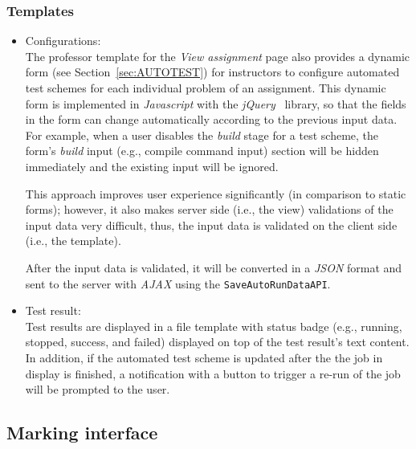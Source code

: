 \subsubsection{Templates}
\begin{itemize}
    \item Configurations: \\
    The professor template for the \emph{View assignment} page also provides
    a dynamic form (see Section~\ref{sec:AUTOTEST}) for instructors to
    configure automated test schemes for
    each individual problem of an assignment. 
    This dynamic form is implemented in \emph{Javascript} with the
    \emph{jQuery}~\cite{jQuery} library, so that the fields in the form can
    change automatically according to the previous input data.
    For example, when a user disables the \emph{build} stage for a test scheme,
    the form's \emph{build} input (e.g., compile command input) section will
    be hidden immediately and the existing input will be ignored.

    This approach improves user experience significantly (in comparison to
    static forms); however, it also makes server side (i.e., the view)
    validations of the
    input data very difficult, thus, the input data is validated on the
    client side (i.e., the template).

    After the input data is validated, it will be converted in a \emph{JSON}
    format and sent to the server with \emph{AJAX} using the 
    \texttt{SaveAutoRunDataAPI}.

    \item Test result: \\
    Test results are displayed in a file template with status badge
    (e.g., running, stopped, success, and failed)
    displayed on top of the test result's text content.
    In addition, if the automated test scheme is updated after the the job
    in display is finished, a notification with a button to trigger a re-run
    of the job will be prompted to the user.
\end{itemize}





\subsection{Marking interface}

